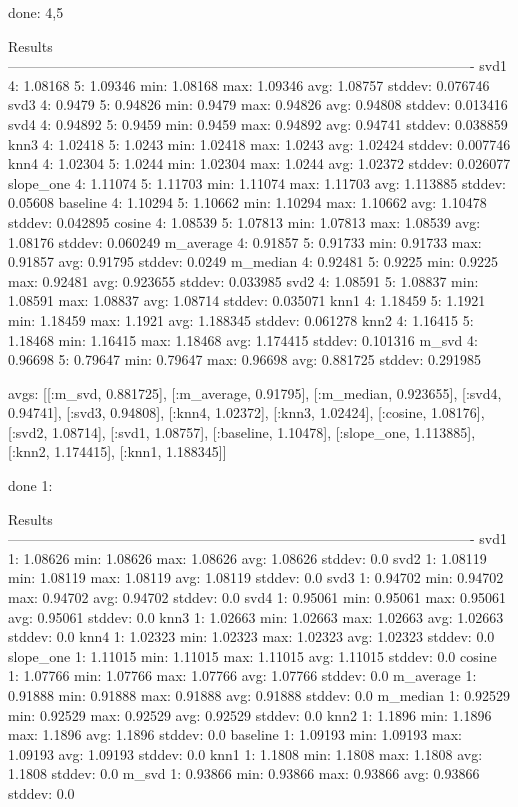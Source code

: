 done: 4,5

  Results
  ----------------------------------------------------------------------------------------------------
  svd1         	  4: 1.08168	  5: 1.09346	min: 1.08168	max: 1.09346	avg: 1.08757	stddev: 0.076746
  svd3         	  4: 0.9479	    5: 0.94826	min: 0.9479	  max: 0.94826	avg: 0.94808	stddev: 0.013416
  svd4         	  4: 0.94892	  5: 0.9459	  min: 0.9459	  max: 0.94892	avg: 0.94741	stddev: 0.038859
  knn3         	  4: 1.02418	  5: 1.0243	  min: 1.02418	max: 1.0243	  avg: 1.02424	stddev: 0.007746
  knn4         	  4: 1.02304	  5: 1.0244	  min: 1.02304	max: 1.0244	  avg: 1.02372	stddev: 0.026077
  slope_one    	  4: 1.11074	  5: 1.11703	min: 1.11074	max: 1.11703	avg: 1.113885	stddev: 0.05608
  baseline     	  4: 1.10294	  5: 1.10662	min: 1.10294	max: 1.10662	avg: 1.10478	stddev: 0.042895
  cosine       	  4: 1.08539	  5: 1.07813	min: 1.07813	max: 1.08539	avg: 1.08176	stddev: 0.060249
  m_average    	  4: 0.91857	  5: 0.91733	min: 0.91733	max: 0.91857	avg: 0.91795	stddev: 0.0249
  m_median     	  4: 0.92481	  5: 0.9225	  min: 0.9225	  max: 0.92481	avg: 0.923655	stddev: 0.033985
  svd2         	  4: 1.08591	  5: 1.08837	min: 1.08591	max: 1.08837	avg: 1.08714	stddev: 0.035071
  knn1         	  4: 1.18459	  5: 1.1921	  min: 1.18459	max: 1.1921	  avg: 1.188345	stddev: 0.061278
  knn2         	  4: 1.16415	  5: 1.18468	min: 1.16415	max: 1.18468	avg: 1.174415	stddev: 0.101316
  m_svd        	  4: 0.96698	  5: 0.79647	min: 0.79647	max: 0.96698	avg: 0.881725	stddev: 0.291985

  avgs:
  [[:m_svd, 0.881725],
   [:m_average, 0.91795],
   [:m_median, 0.923655],
   [:svd4, 0.94741],
   [:svd3, 0.94808],
   [:knn4, 1.02372],
   [:knn3, 1.02424],
   [:cosine, 1.08176],
   [:svd2, 1.08714],
   [:svd1, 1.08757],
   [:baseline, 1.10478],
   [:slope_one, 1.113885],
   [:knn2, 1.174415],
   [:knn1, 1.188345]]



done 1:

  Results
  ----------------------------------------------------------------------------------------------------
  svd1           	  1: 1.08626	min: 1.08626	max: 1.08626	avg: 1.08626	stddev: 0.0
  svd2           	  1: 1.08119	min: 1.08119	max: 1.08119	avg: 1.08119	stddev: 0.0
  svd3           	  1: 0.94702	min: 0.94702	max: 0.94702	avg: 0.94702	stddev: 0.0
  svd4           	  1: 0.95061	min: 0.95061	max: 0.95061	avg: 0.95061	stddev: 0.0
  knn3           	  1: 1.02663	min: 1.02663	max: 1.02663	avg: 1.02663	stddev: 0.0
  knn4           	  1: 1.02323	min: 1.02323	max: 1.02323	avg: 1.02323	stddev: 0.0
  slope_one      	  1: 1.11015	min: 1.11015	max: 1.11015	avg: 1.11015	stddev: 0.0
  cosine         	  1: 1.07766	min: 1.07766	max: 1.07766	avg: 1.07766	stddev: 0.0
  m_average      	  1: 0.91888	min: 0.91888	max: 0.91888	avg: 0.91888	stddev: 0.0
  m_median       	  1: 0.92529	min: 0.92529	max: 0.92529	avg: 0.92529	stddev: 0.0
  knn2           	  1: 1.1896	min: 1.1896	max: 1.1896	avg: 1.1896	stddev: 0.0
  baseline       	  1: 1.09193	min: 1.09193	max: 1.09193	avg: 1.09193	stddev: 0.0
  knn1           	  1: 1.1808	min: 1.1808	max: 1.1808	avg: 1.1808	stddev: 0.0
  m_svd          	  1: 0.93866	min: 0.93866	max: 0.93866	avg: 0.93866	stddev: 0.0

